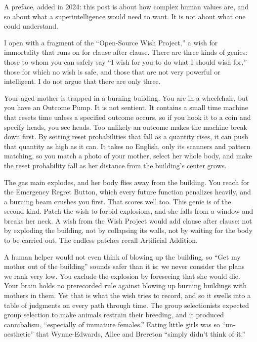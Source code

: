 
A preface, added in 2024: this post is about how complex human values are, and so about what a superintelligence would need to want. It is not about what one could understand. 

I open with a fragment of the ``Open-Source Wish Project,'' a wish for immortality that runs on for clause after clause. There are three kinds of genies: those to whom you can safely say ``I wish for you to do what I should wish for,'' those for which no wish is safe, and those that are not very powerful or intelligent. I do not argue that there are only three.

Your aged mother is trapped in a burning building. You are in a wheelchair, but you have an Outcome Pump. It is not sentient. It contains a small time machine that resets time unless a specified outcome occurs, so if you hook it to a coin and specify heads, you see heads. Too unlikely an outcome makes the machine break down first. By setting reset probabilities that fall as a quantity rises, it can push that quantity as high as it can. It takes no English, only its scanners and pattern matching, so you match a photo of your mother, select her whole body, and make the reset probability fall as her distance from the building's center grows.

The gas main explodes, and her body flies away from the building. You reach for the Emergency Regret Button, which every future function penalizes heavily, and a burning beam crushes you first. That scores well too. This genie is of the second kind. Patch the wish to forbid explosions, and she falls from a window and breaks her neck. A wish from the Wish Project would add clause after clause: not by exploding the building, not by collapsing its walls, not by waiting for the body to be carried out. The endless patches recall Artificial Addition.

A human helper would not even think of blowing up the building, so ``Get my mother out of the building'' sounds safer than it is; we never consider the plans we rank very low. You exclude the explosion by foreseeing that she would die. Your brain holds no prerecorded rule against blowing up burning buildings with mothers in them. Yet that is what the wish tries to record, and so it swells into a table of judgments on every path through time. The group selectionists expected group selection to make animals restrain their breeding, and it produced cannibalism, ``especially of immature females.'' Eating little girls was so ``un-aesthetic'' that Wynne-Edwards, Allee and Brereton ``simply didn't think of it.'' 

